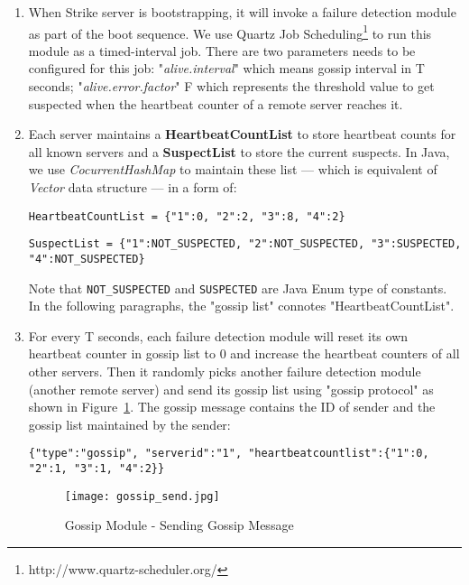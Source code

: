 \documentclass[dareport.tex]{subfiles}
\begin{document}
\begin{enumerate}[leftmargin=*]
\item When Strike server is bootstrapping, it will invoke a failure detection module as part of the boot sequence. We use Quartz Job Scheduling\footnote{http://www.quartz-scheduler.org/} to run this module as a timed-interval job. There are two parameters needs to be configured for this job: "\emph{alive.interval}" which means gossip interval in T seconds; "\emph{alive.error.factor}" F which represents the threshold value to get suspected when the heartbeat counter of a remote server reaches it.

\item Each server maintains a \textbf{HeartbeatCountList} to store heartbeat counts for all known servers and a \textbf{SuspectList} to store the current suspects. In Java, we use \emph{CocurrentHashMap} to maintain these list --- which is equivalent of \emph{Vector} data structure --- in a form of:

\verb|HeartbeatCountList = {"1":0, "2":2, "3":8, "4":2}|

\verb|SuspectList = {"1":NOT_SUSPECTED, "2":NOT_SUSPECTED, "3":SUSPECTED, "4":NOT_SUSPECTED}|

Note that \verb|NOT_SUSPECTED| and \verb|SUSPECTED| are Java Enum type of constants. In the following paragraphs, the "gossip list" connotes "HeartbeatCountList".

\item For every T seconds, each failure detection module will reset its own heartbeat counter in gossip list to 0 and increase the heartbeat counters of all other servers. Then it randomly picks another failure detection module (another remote server) and send its gossip list using "gossip protocol" as shown in Figure~\ref{fig:sending_gmsg}. The gossip message contains the ID of sender and the gossip list maintained by the sender:

\begin{small}
\begin{verbatim}
{"type":"gossip", "serverid":"1", "heartbeatcountlist":{"1":0, "2":1, "3":1, "4":2}}
\end{verbatim}
\end{small}


\begin{figure}[h]
\texttt{[image: gossip\_send.jpg]}
\centering
\caption{Gossip Module - Sending Gossip Message}
\label{fig:sending_gmsg}
\centering
\end{figure}


\end{enumerate}
\end{document}
